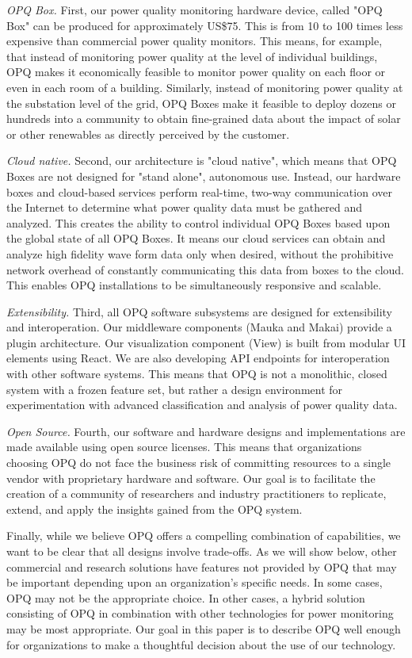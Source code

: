 \documentclass[preprints,article,accept,moreauthors,pdftex]{Definitions/mdpi}
\begin{document}
{\em OPQ Box.} First, our power quality monitoring hardware device, called "OPQ Box" can be produced for approximately US\$75. This is from 10 to 100 times less expensive than commercial power quality monitors. This means, for example, that instead of monitoring power quality at the level of individual buildings, OPQ makes it economically feasible to monitor power quality on each floor or even in each room of a building. Similarly, instead of monitoring power quality at the substation level of the grid, OPQ Boxes make it feasible to deploy dozens or hundreds into a community to obtain fine-grained data about the impact of solar or other renewables as directly perceived by the customer.

{\em Cloud native.} Second, our architecture is "cloud native", which means that OPQ Boxes are not designed for "stand alone", autonomous use. Instead, our hardware boxes and cloud-based services perform real-time, two-way communication over the Internet to determine what power quality data must be gathered and analyzed. This creates the ability to control individual OPQ Boxes based upon the global state of all OPQ Boxes. It means our cloud services can obtain and analyze high fidelity wave form data only when desired, without the prohibitive network overhead of constantly communicating this data from boxes to the cloud. This enables OPQ installations to be simultaneously responsive and scalable.

{\em Extensibility.} Third, all OPQ software subsystems are designed for extensibility and interoperation. Our middleware components (Mauka and Makai) provide a plugin architecture. Our visualization component (View) is built from modular UI elements using React. We are also developing API endpoints for interoperation with other software systems. This means that OPQ is not a monolithic, closed system with a frozen feature set, but rather a design environment for experimentation with advanced classification and analysis of power quality data.

{\em Open Source.} Fourth, our software and hardware designs and implementations are made available using open source licenses. This means that organizations choosing OPQ do not face the business risk of committing resources to a single vendor with proprietary hardware and software. Our goal is to facilitate the creation of a community of researchers and industry practitioners to replicate, extend, and apply the insights gained from the OPQ system.

Finally, while we believe OPQ offers a compelling combination of capabilities, we want to be clear that all designs involve trade-offs. As we will show below, other commercial and research solutions have features not provided by OPQ that may be important depending upon an organization's specific needs. In some cases, OPQ may not be the appropriate choice. In other cases, a hybrid solution consisting of OPQ in combination with other technologies for power monitoring may be most appropriate. Our goal in this paper is to describe OPQ well enough for organizations to make a thoughtful decision about the use of our technology.
\end{document}
